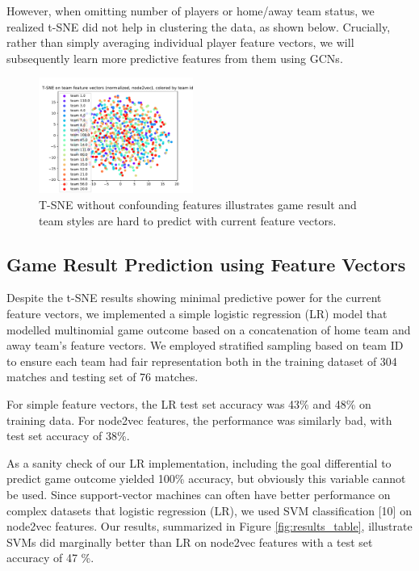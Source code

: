However, when omitting number of players or home/away team status, we realized t-SNE did not help in clustering the data, as shown below. 
Crucially, rather than simply averaging individual player feature vectors, we 
will subsequently learn more predictive features from them using GCNs.


\begin{figure}[h]
  \label{fig:tsne}
  \centering
  \includegraphics[width=0.45\textwidth]{plots/node2vec_NORM_game_team_teamId_tsne.pdf}
  \caption{T-SNE without confounding features illustrates game result and team styles are hard to predict with current feature vectors.}
    \label{fig:tsne_team}
\end{figure}


\subsection{Game Result Prediction using Feature Vectors}
Despite the t-SNE results showing minimal predictive power for the current feature vectors, we implemented a simple logistic regression (LR) model that modelled multinomial game outcome based on a concatenation of home team and away team's feature vectors. We employed stratified sampling based on team ID to ensure each team had fair representation both in the training dataset of 304 matches and testing set of 76 matches. 

For simple feature vectors, the LR test set accuracy was 43\% and 48\% on training data. For node2vec features, the performance was similarly bad, with test set accuracy of 38\%. 

As a sanity check of our LR implementation, including the goal differential to predict game outcome yielded 100\% accuracy, but obviously this variable cannot be used. Since support-vector machines can often have
better performance on complex datasets that logistic regression (LR), we used SVM classification [10] on node2vec features. Our results, summarized in Figure \ref{fig:results_table}, illustrate SVMs did marginally better than LR on node2vec features with a test set accuracy of 47 \%.

